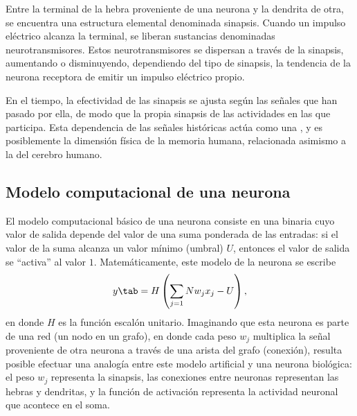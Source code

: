 Entre la terminal de la hebra proveniente de una neurona y la
dendrita de otra, se encuentra una estructura elemental denominada
sinapsis.  Cuando un impulso eléctrico alcanza la terminal, 
se liberan sustancias denominadas neurotransmisores. Estos
neurotransmisores se dispersan a través de la sinapsis, aumentando o
disminuyendo, dependiendo del tipo de sinapsis, la tendencia de la
neurona receptora de emitir un impulso eléctrico propio.

En el tiempo, la efectividad de las sinapsis se ajusta según las
señales que han pasado por ella, de modo que la propia sinapsis
 de las actividades en las que participa. Esta dependencia
de las señales históricas actúa como una , y es
posiblemente la dimensión física de la memoria humana, relacionada
asimismo a la  del cerebro humano.
%
%
\subsection{Modelo computacional de una neurona}
%
El modelo computacional básico de una neurona 
\cite{mcculloch-pitts} consiste en una
 binaria cuyo valor de salida depende del
valor de una suma ponderada de las entradas: si el valor de la suma
alcanza un valor mínimo (umbral) $U$, entonces el valor de salida se
``activa'' al valor $1$.  Matemáticamente, este modelo de la neurona
se escribe
%
\begin{align}\label{e2:neuron-basic}
  y \tab = H\left( \sum_{j=1}{N} w_j x_j - U\right),
\end{align}
%
en donde $H$ es la función escalón unitario.
Imaginando que esta neurona es parte de una red (un nodo en un grafo),
en donde cada peso $w_j$ multiplica la señal proveniente de otra
neurona a través de una arista del grafo (conexión), resulta posible
efectuar una analogía entre este modelo artificial y una neurona
biológica: el peso $w_j$ representa la sinapsis, las conexiones entre
neuronas representan las hebras y dendritas, y la función de
activación representa la actividad neuronal que acontece en el soma.

